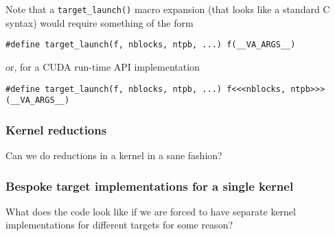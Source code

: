 Note that a \texttt{target\_launch()} macro expansion (that looks
like a standard C syntax) would require something of the form
\begin{lstlisting}
#define target_launch(f, nblocks, ntpb, ...) f(__VA_ARGS__)
\end{lstlisting}
or, for a CUDA run-time API implementation
\begin{lstlisting}
#define target_launch(f, nblocks, ntpb, ...) f<<<nblocks, ntpb>>>(__VA_ARGS__)
\end{lstlisting}



\subsubsection{Kernel reductions}

Can we do reductions in a kernel in a sane fashion?

\subsubsection{Bespoke target implementations for a single kernel}

What does the code look like if we are forced to have separate kernel
implementations for different targets for some reason?

\vfill
\pagebreak

